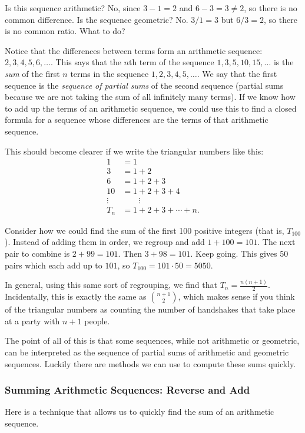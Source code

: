 \documentclass[12pt]{article}
\begin{document}
Is this sequence arithmetic?  No, since $3-1 = 2$ and $6-3 = 3 \ne 2$, so there is no common difference.  Is the sequence geometric?  No.  $3/1 = 3$ but $6/3 = 2$, so there is no common ratio.  What to do?

Notice that the differences between terms form an arithmetic sequence: $2, 3, 4, 5, 6,\ldots$.  This says that the $n$th term of the sequence $1,3,5,10,15,\ldots$ is the {\em sum} of the first $n$ terms in the sequence $1,2,3,4,5,\ldots$.  We say that the first sequence is the {\em sequence of partial sums} of the second sequence (partial sums because we are not taking the sum of all infinitely many terms). If we know how to add up the terms of an arithmetic sequence, we could use this to find a closed formula for a sequence whose differences are the terms of that arithmetic sequence.

This should become clearer if we write the triangular numbers like this:
\begin{align*}
1 &= 1\\
3 &= 1+2\\
6 &= 1 + 2 + 3\\
10 &= 1+2 + 3+ 4\\
\vdots & \qquad \vdots \\
T_n &= 1 + 2 + 3 + \cdots + n.
\end{align*}

Consider how we could find the sum of the first 100 positive integers (that is, $T_{100}$).  Instead of adding them in order, we regroup and add $1+100 = 101$.  The next pair to combine is $2+99 = 101$.  Then $3+98 = 101$.  Keep going.  This gives 50 pairs which each add up to $101$, so $T_{100} = 101\cdot 50 = 5050$.

In general, using this same sort of regrouping, we find that $T_n = \frac{n(n+1)}{2}$.  Incidentally, this is exactly the same as ${n+1 \choose 2}$, which makes sense if you think of the triangular numbers as counting the number of handshakes that take place at a party with $n+1$ people.

The point of all of this is that some sequences, while not arithmetic or geometric, can be interpreted as the sequence of partial sums of arithmetic and geometric sequences.  Luckily there are methods we can use to compute these sums quickly.

\subsubsection*{Summing Arithmetic Sequences: Reverse and Add}
Here is a technique that allows us to quickly find the sum of an arithmetic sequence.
\end{document}
